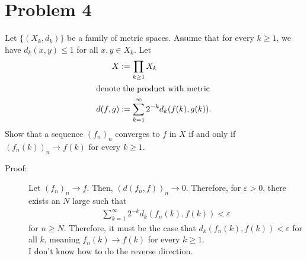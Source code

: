 \documentclass[8pt]{extarticle}
\begin{document}
  \section{Problem 4}%
  Let $\{(X_k,d_k)\}$ be a family of metric spaces. Assume that for every $k\geq 1$, we have $d_k(x,y)\leq 1$ for all $x,y\in X_k$. Let 
  \begin{align*}
    X &:= \prod_{k\geq 1}X_k\\
    \intertext{denote the product with metric}
    d(f,g) &:= \sum_{k=1}^{\infty}2^{-k}d_k(f(k),g(k)).
  \end{align*}
  Show that a sequence $(f_n)_n$ converges to $f$ in $X$ if and only if $(f_n(k))_n\rightarrow f(k)$ for every $k\geq 1$.
    \begin{description}
      \item[Proof:] Let $(f_n)_n\rightarrow f$. Then, $(d(f_n,f))_n\rightarrow 0$. Therefore, for $\varepsilon > 0$, there exists an $N$ large such that
        \begin{align*}
          \sum_{k=1}^{\infty}2^{-k}d_k(f_n(k),f(k)) < \varepsilon
        \end{align*}
        for $n\geq N$. Therefore, it must be the case that $d_k(f_n(k),f(k)) < \varepsilon$ for all $k$, meaning $f_n(k)\rightarrow f(k)$ for every $k\geq 1$.\\

        I don't know how to do the reverse direction.
    \end{description}
\end{document}
